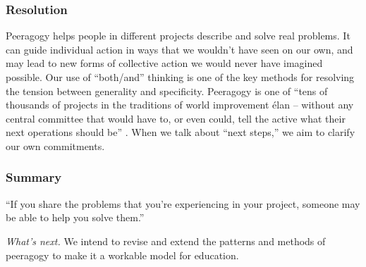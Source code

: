 

\subsubsection*{Resolution}
Peeragogy helps people in different projects describe and solve real problems.  It can guide individual action in ways that we wouldn't have seen on our own, and may lead to new forms of collective action we would never have imagined possible.
%
Our use of ``both/and'' thinking is one of the key methods for resolving the tension between generality and specificity.
Peeragogy is one of ``tens of thousands of projects in the traditions of world improvement \'elan -- without any central committee that would have to, or even could, tell the active what their next operations should be'' \cite[p. 402]{sloterdijk2013change}.  When we talk about ``next steps,'' we aim to clarify our own commitments.

\subsubsection*{Summary}
``If you share the problems that you're experiencing in your project, someone may be able to help you solve them.''

\begin{framed}
\noindent 
\emph{What's next.} We intend to revise and extend the patterns and methods of peeragogy to make it a workable model for education.
\end{framed}

